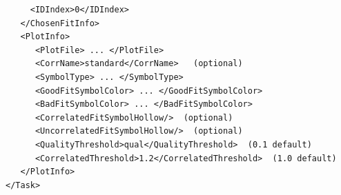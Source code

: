 \documentclass[12pt]{article}
\begin{document}
\begin{verbatim}
     <IDIndex>0</IDIndex>                                                
   </ChosenFitInfo>                                                      
   <PlotInfo>                                                            
      <PlotFile> ... </PlotFile>                                         
      <CorrName>standard</CorrName>   (optional)                         
      <SymbolType> ... </SymbolType>                                     
      <GoodFitSymbolColor> ... </GoodFitSymbolColor>                     
      <BadFitSymbolColor> ... </BadFitSymbolColor>                       
      <CorrelatedFitSymbolHollow/>  (optional)                           
      <UncorrelatedFitSymbolHollow/>  (optional)                         
      <QualityThreshold>qual</QualityThreshold>  (0.1 default)           
      <CorrelatedThreshold>1.2</CorrelatedThreshold>  (1.0 default)      
   </PlotInfo>                                                           
</Task>                                                                  
\end{verbatim}                                                         
                                                                         
\end{document}
